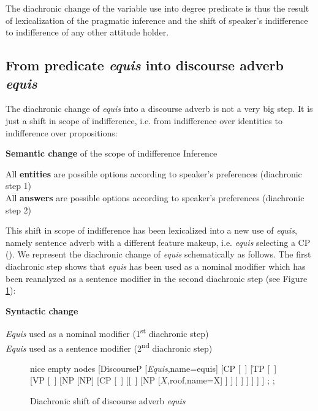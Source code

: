 \documentclass[output=paper
,modfonts
,nonflat]{langsci/langscibook}
\begin{document}
The diachronic change of the variable use into degree predicate is thus the result of lexicalization of the pragmatic inference and the shift of speaker’s indifference to indifference of any other attitude holder.


\subsection{From predicate \textit{equis} into discourse adverb \textit{equis}}\label{sec:kellert:4.2}
The diachronic change of \textit{equis} into a discourse adverb is not a very big step. It is just a shift in scope of indifference, i.e. from indifference over identities to indifference over propositions:

\ea \textbf{Semantic change} of the scope of indifference Inference\\
\begin{xlist}
 All \textbf{entities} are possible options according to speaker’s preferences (diachronic step 1)\\
 All \textbf{answers} are possible options according to speaker’s preferences (diachronic step 2)
\end{xlist}
\z

This shift in scope of indifference has been lexicalized into a new use of \textit{equis}, namely sentence adverb with a different feature makeup, i.e. \textit{equis} selecting a CP (). We represent the diachronic change of \textit{equis} schematically as follows. The first diachronic step shows that \textit{equis} has been used as a nominal modifier which has been reanalyzed as a sentence modifier in the second diachronic step (see Figure \ref{fig:kellert:tree4n}):

\ea \textbf{Syntactic change}\\
\begin{xlist}
	\textit{Equis} used as a nominal modifier (1\textsuperscript{st} diachronic step)\\
	\textit{Equis} used as a sentence modifier (2\textsuperscript{nd} diachronic step)\\
\end{xlist}
\z

\begin{figure}
	\caption{Diachronic shift of discourse adverb \textit{equis}\label{fig:kellert:tree4n}}
	\begin{forest} nice empty nodes
	[DiscourseP
	[\textit{Equis},name=equis] [CP
	[~] [TP
	[~] [VP
	[~] [NP
	[NP] [CP
	[~] [[~] [NP
	[$X$,roof,name=X]
	]
	]
	]
	]
	]
	]
	]
	]
	;
	;
\end{forest}
\end{figure}
\end{document}
